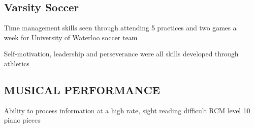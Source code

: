 \documentclass[letterpaper]{deedy-resume} %
\begin{document}
\begin{minipage}[t]{0.33\textwidth}
\subsection{Varsity Soccer}

\begin{tightitemize}

\sectionspace
    \item Time management skills seen through attending 5 practices and two games a week for University of Waterloo soccer team
    \item Self-motivation, leadership and perseverance were all skills developed through athletics


\end{tightitemize}



\sectionspace
\subsection{MUSICAL PERFORMANCE}

\begin{tightitemize}

\sectionspace 

    \item Ability to process information at a high rate, sight reading difficult RCM level 10 piano pieces
    
    

\end{tightitemize}





\end{minipage} %
\hfill
%
%
\end{document}
